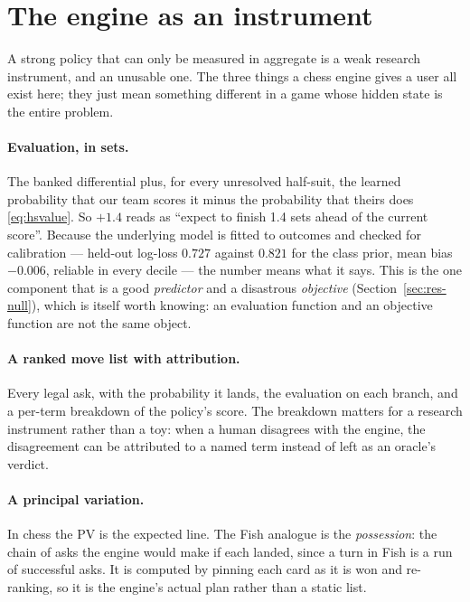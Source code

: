 \documentclass[11pt,a4paper]{article}
\begin{document}
\section{The engine as an instrument}
\label{sec:engine}

A strong policy that can only be measured in aggregate is a weak research
instrument, and an unusable one. The three things a chess engine gives a user
all exist here; they just mean something different in a game whose hidden state
is the entire problem.

\paragraph{Evaluation, in sets.} The banked differential plus, for every
unresolved half-suit, the learned probability that our team scores it minus the
probability that theirs does \eqref{eq:hsvalue}. So $+1.4$ reads as ``expect to
finish 1.4 sets ahead of the current score''. Because the underlying model is
fitted to outcomes and checked for calibration --- held-out log-loss $0.727$
against $0.821$ for the class prior, mean bias $-0.006$, reliable in every
decile --- the number means what it says. This is the one component that is a
good \emph{predictor} and a disastrous \emph{objective}
(Section~\ref{sec:res-null}), which is itself worth knowing: an evaluation
function and an objective function are not the same object.

\paragraph{A ranked move list with attribution.} Every legal ask, with the
probability it lands, the evaluation on each branch, and a per-term breakdown of
the policy's score. The breakdown matters for a research instrument rather than
a toy: when a human disagrees with the engine, the disagreement can be
attributed to a named term instead of left as an oracle's verdict.

\paragraph{A principal variation.} In chess the PV is the expected line. The
Fish analogue is the \emph{possession}: the chain of asks the engine would make
if each landed, since a turn in Fish is a run of successful asks. It is computed
by pinning each card as it is won and re-ranking, so it is the engine's actual
plan rather than a static list.
\end{document}
